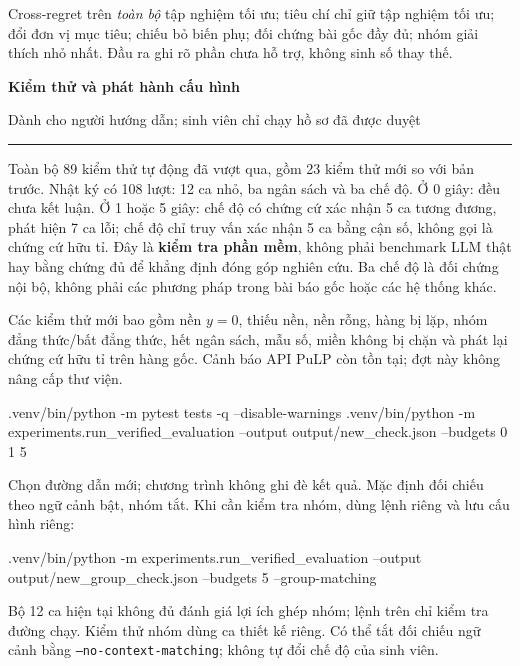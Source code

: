 \documentclass[11pt,a4paper]{article}
\newcommand{\heading}[1]{\par\vspace{4pt}{\large\bfseries #1}\par}
\begin{document}
\heading{3. Chưa được triển khai}
Cross-regret trên \emph{toàn bộ} tập nghiệm tối ưu; tiêu chí chỉ giữ tập nghiệm
tối ưu; đổi đơn vị mục tiêu; chiếu bỏ biến phụ; đối chứng bài gốc đầy đủ;
nhóm giải thích nhỏ nhất. Đầu ra ghi rõ phần chưa hỗ trợ, không sinh số thay thế.

\newpage
{\LARGE\bfseries Kiểm thử và phát hành cấu hình}\par
{\small Dành cho người hướng dẫn; sinh viên chỉ chạy hồ sơ đã được duyệt}\par
\hrule\vspace{5pt}

\heading{4. Kiểm tra đã chạy}
Toàn bộ 89 kiểm thử tự động đã vượt qua, gồm 23 kiểm thử mới so với bản trước.
Nhật ký  có 108 lượt:
12 ca nhỏ, ba ngân sách và ba chế độ. Ở 0 giây: đều chưa kết luận.
Ở 1 hoặc 5 giây: chế độ có chứng cứ xác nhận 5 ca tương đương, phát hiện 7 ca lỗi;
chế độ chỉ truy vấn xác nhận 5 ca bằng cận số, không gọi là chứng cứ hữu tỉ.
Đây là \textbf{kiểm tra phần mềm}, không phải benchmark LLM thật hay bằng chứng
đủ để khẳng định đóng góp nghiên cứu. Ba chế độ là đối chứng nội bộ, không phải
các phương pháp trong bài báo gốc hoặc các hệ thống khác.

Các kiểm thử mới bao gồm nền $y=0$, thiếu nền, nền rỗng, hàng bị lặp,
nhóm đẳng thức/bất đẳng thức, hết ngân sách, mẫu số, miền không bị chặn và
phát lại chứng cứ hữu tỉ trên hàng gốc. Cảnh báo API PuLP còn tồn tại;
đợt này không nâng cấp thư viện.

\heading{5. Lệnh dành cho thầy, tại thư mục gốc dự án}
\begin{cmd}
.venv/bin/python -m pytest tests -q --disable-warnings
.venv/bin/python -m experiments.run_verified_evaluation --output output/new_check.json --budgets 0 1 5
\end{cmd}
Chọn đường dẫn mới; chương trình không ghi đè kết quả. Mặc định đối chiếu theo
ngữ cảnh bật, nhóm tắt. Khi cần kiểm tra nhóm, dùng lệnh riêng và lưu cấu hình riêng:
\begin{cmd}
.venv/bin/python -m experiments.run_verified_evaluation --output output/new_group_check.json --budgets 5 --group-matching
\end{cmd}
Bộ 12 ca hiện tại không đủ đánh giá lợi ích ghép nhóm; lệnh trên chỉ kiểm tra
đường chạy. Kiểm thử nhóm dùng ca thiết kế riêng. Có thể tắt đối chiếu ngữ cảnh
bằng \texttt{--no-context-matching}; không tự đổi chế độ của sinh viên.
\end{document}

